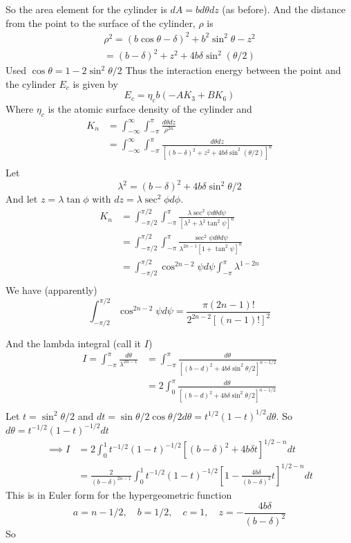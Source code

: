 \documentclass{E:/Documents/Latex/myassignment}
\begin{document}
So the area element for the cylinder is $dA = b d\theta dz$ (as before). And the distance from the point to the surface of the cylinder, $\rho$ is 
\begin{align*}
	\rho^2 = (b\cos\theta - \delta)^2 + b^2 \sin^2 \theta -z^2\\
	= (b- \delta)^2 + z^2 + 4b \delta \sin^2(\theta/2)
\end{align*}
Used $\cos\theta = 1-2\sin^2\theta/2$
Thus the interaction energy between the point and the cylinder $E_c$ is given by
\[E_c = \eta_c b(-AK_3 + BK_6)\]
Where $\eta_c$ is the atomic surface density of the cylinder and 
\begin{align*}
	K_n &= \int_{-\infty}^{\infty} \int_{-\pi}^{\pi} \frac{d\theta dz}{\rho^{2n}}\\
	&= \int_{-\infty}^{\infty} \int_{-\pi}^{\pi} \frac{d\theta dz}{\left[(b- \delta)^2 + z^2 + 4b \delta \sin^2(\theta/2)\right]^{n}}\\
\end{align*}
Let 
\[\lambda^2 = (b- \delta)^2 + 4b \delta \sin^2 \theta/2\]
And let $z = \lambda \tan \phi$ with $dz = \lambda \sec^2\phi d\phi$.
\begin{align*}
	K_n &= \int_{-\pi/2}^{\pi/2} \int_{-\pi}^{\pi} \frac{\lambda \sec^2 \psi d\theta d\psi}{\left[\lambda^2 + \lambda^2 \tan^2 \psi\right]^n}\\
	&= \int_{-\pi/2}^{\pi/2} \int_{-\pi}^{\pi} \frac{\sec^2 \psi d\theta d\psi}{\lambda^{2n-1}\left[1 + \tan^2 \psi\right]^n}\\
	&= \int_{-\pi/2}^{\pi/2} \cos^{2n-2} \psi d\psi \int_{-\pi}^{\pi} \lambda^{1-2n}\\
\end{align*}
We have (apparently)
\[\int_{-\pi/2}^{\pi/2} \cos^{2n-2} \psi d\psi = \frac{\pi (2n-1)!}{2^{2n-2} [(n-1)!]^2}\]

And the lambda integral (call it $I$)
\begin{align*}
	I = \int_{-\pi}^{\pi} \frac{d\theta}{\lambda^{2n-1}} &= \int_{-\pi}^{\pi} \frac{d\theta}{\left[(b-d)^2 + 4b \delta\sin^2\theta/2\right]^{n-1/2}}\\
	&= 2\int_{0}^{\pi} \frac{d\theta}{\left[(b-d)^2 + 4b \delta\sin^2\theta/2\right]^{n-1/2}}\\
\end{align*}
Let $t = \sin^2\theta/2$ and $dt = \sin\theta/2 \cos\theta/2 d\theta = t^{1/2} (1-t)^{1/2} d\theta$. So $d\theta = t^{-1/2} (1-t)^{-1/2} dt$
\begin{align*}
	\implies I &= 2\int_0^1 t^{-1/2} (1-t)^{-1/2} \left[(b -\delta)^2 + 4b \delta t\right]^{1/2 - n} dt\\
	&= \frac{2}{(b- \delta)^{2n-1}} \int_0^1 t^{-1/2} (1-t)^{-1/2} \left[1 - \frac{4b \delta}{(b- \delta)^2} t \right]^{1/2-n} dt
\end{align*}
This is in Euler form for the hypergeometric function
\[a = n-1/2, \quad b = 1/2, \quad c = 1, \quad z = -\frac{4b \delta}{(b- \delta)^2}\]
So
\end{document}

